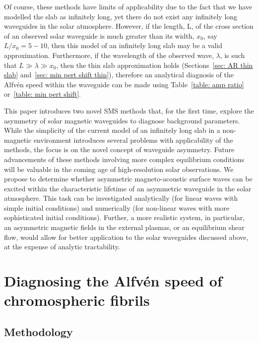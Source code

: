 \documentclass[12pt]{../style-files/ociamthesis}
\begin{document}
Of course, these methods have limits of applicability due to the fact that we have modelled the slab as infinitely long, yet there do not exist any infinitely long waveguides in the solar atmosphere. However, if the length, L, of the cross section of an observed solar waveguide is much greater than its width, $x_0$, say $L/x_0=5-10$, then this model of an infinitely long slab may be a valid approximation. Furthermore, if the wavelength of the observed wave, $\lambda$, is such that $L \gg \lambda \gg x_0$, then the thin slab approximation holds (Sections~\ref{sec: AR thin slab} and~\ref{sec: min pert shift thin}), therefore an analytical diagnosis of the Alfv\'{e}n speed within the waveguide can be made using Table~\ref{table: amp ratio} or~\ref{table: min pert shift}.

This paper introduces two novel SMS methods that, for the first time, explore the asymmetry of solar magnetic waveguides to diagnose background parameters. While the simplicity of the current model of an infinitely long slab in a non-magnetic environment introduces several problems with applicability of the methods, the focus is on the novel concept of waveguide asymmetry. Future advancements of these methods involving more complex equilibrium conditions will be valuable in the coming age of high-resolution solar observations. We propose to determine whether asymmetric magneto-acoustic surface waves can be excited within the characteristic lifetime of an asymmetric waveguide in the solar atmosphere. This task can be investigated analytically (for linear waves with simple initial conditions) and numerically (for non-linear waves with more sophisticated initial conditions). Further, a more realistic system, in particular, an asymmetric magnetic fields in the external plasmas, or an equilibrium shear flow, would allow for better application to the solar waveguides discussed above, at the expense of analytic tractability.

\color{black}

\section{Diagnosing the Alfv\'{e}n speed of chromospheric fibrils}
\label{sec: fibrils}

\subsection{Methodology}
\end{document}
